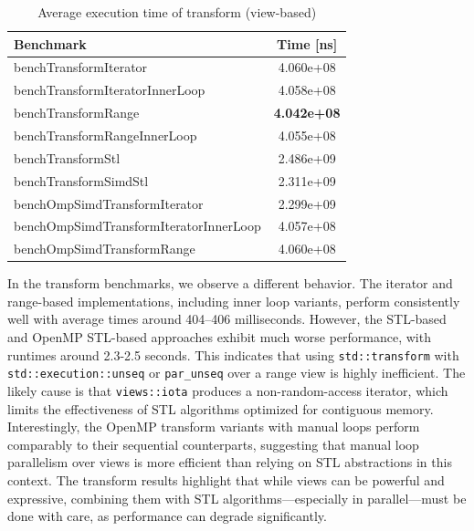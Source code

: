 \begin{table}[h!]
    \centering
    \begin{tabular}{|l|c|}
        \hline
        \textbf{Benchmark}                     & \textbf{Time [ns]} \\
        \hline
        benchTransformIterator                 & 4.060e+08          \\
        benchTransformIteratorInnerLoop        & 4.058e+08          \\
        benchTransformRange                    & \textbf{4.042e+08} \\
        benchTransformRangeInnerLoop           & 4.055e+08          \\
        benchTransformStl                      & 2.486e+09          \\
        benchTransformSimdStl                  & 2.311e+09          \\
        benchOmpSimdTransformIterator          & 2.299e+09          \\
        benchOmpSimdTransformIteratorInnerLoop & 4.057e+08          \\
        benchOmpSimdTransformRange             & 4.060e+08          \\
        \hline
    \end{tabular}
    \caption{Average execution time of transform (view-based)}
    \label{tab:transformV}
\end{table}

In the transform benchmarks, we observe a different behavior.
The iterator and range-based implementations, including inner loop variants, perform consistently well with average times around 404--406 milliseconds.
However, the STL-based and OpenMP STL-based approaches exhibit much worse performance, with runtimes around 2.3-2.5 seconds.
This indicates that using \texttt{std::transform} with \texttt{std::execution::unseq} or \texttt{par\_unseq} over a range view is highly inefficient.
The likely cause is that \texttt{views::iota} produces a non-random-access iterator, which limits the effectiveness of STL algorithms optimized for contiguous memory.
Interestingly, the OpenMP transform variants with manual loops perform comparably to their sequential counterparts, suggesting that manual loop parallelism over views is more efficient than relying on STL abstractions in this context.
The transform results highlight that while views can be powerful and expressive, combining them with STL algorithms—especially in parallel—must be done with care, as performance can degrade significantly.

